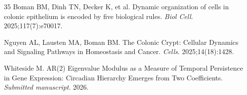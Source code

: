\documentclass[11pt,letterpaper]{article}
\begin{document}
\begin{thebibliography}{35}
Boman BM, Dinh TN, Decker K, et al.
Dynamic organization of cells in colonic epithelium is encoded by five biological rules.
\textit{Biol Cell}. 2025;117(7):e70017.

Nguyen AL, Lausten MA, Boman BM.
The Colonic Crypt: Cellular Dynamics and Signaling Pathways in Homeostasis and Cancer.
\textit{Cells}. 2025;14(18):1428.

Whiteside M.
AR(2) Eigenvalue Modulus as a Measure of Temporal Persistence in Gene Expression: Circadian Hierarchy Emerges from Two Coefficients.
\textit{Submitted manuscript}. 2026.

\end{thebibliography}
\end{document}

